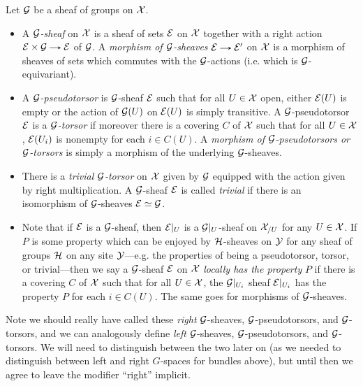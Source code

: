 \begin{definitions}
  Let $\mathcal{G}$ be a sheaf of groups on $\mathcal{X}$.
  \begin{itemize}
  \item A \emph{$\mathcal{G}$-sheaf} on $\mathcal{X}$ is a sheaf of sets $\mathcal{E}$ on $\mathcal{X}$
    together with a right action $\E \times \G \to \E$ of $\mathcal{G}$. A
    \emph{morphism of $\mathcal{G}$-sheaves} $\E \to \E'$ on $\mathcal{X}$ is a morphism
    of sheaves of sets which commutes with the $\mathcal{G}$-actions
    (i.e. which is $\mathcal{G}$-equivariant).
  \item A \emph{$\mathcal{G}$-pseudotorsor} is $\mathcal{G}$-sheaf $\mathcal{E}$ such that for
    all $U \in \mathcal{X}$ open, either $\mathcal{E}(U)$ is empty or the action of
    $\mathcal{G}(U)$ on $\mathcal{E}(U)$ is simply transitive. A $\mathcal{G}$-pseudotorsor $\mathcal{E}$
    is a \emph{$\mathcal{G}$-torsor} if moreover there is a covering $C$ of
    $\mathcal{X}$ such that for all $U \in \mathcal{X}$, $\mathcal{E}(U_i)$ is nonempty for each
    $i \in C(U)$. A \emph{morphism of $\mathcal{G}$-pseudotorsors or
      $\mathcal{G}$-torsors} is simply a morphism of the underlying
    $\mathcal{G}$-sheaves.
  \item There is a \emph{trivial $\mathcal{G}$-torsor} on $\mathcal{X}$ given by $\mathcal{G}$
    equipped with the action given by right multiplication. A
    $\mathcal{G}$-sheaf $\mathcal{E}$ is called \emph{trivial} if there is an
    isomorphism of $\mathcal{G}$-sheaves $\mathcal{E} \simeq \mathcal{G}$.
  \item Note that if $\mathcal{E}$ is a $\mathcal{G}$-sheaf, then $\mathcal{E}|_U$ is a
    $\mathcal{G}|_U$-sheaf on $\mathcal{X}_{/U}$ for any $U \in \mathcal{X}$. If $P$ is some
    property which can be enjoyed by $\mathcal{H}$-sheaves on $\mathcal{Y}$ for any
    sheaf of groups $\mathcal{H}$ on any site $\mathcal{Y}$---e.g. the properties of
    being a pseudotorsor, torsor, or trivial---then we say a
    $\mathcal{G}$-sheaf $\mathcal{E}$ on $\mathcal{X}$ \emph{locally has the property} $P$ if
    there is a covering $C$ of $\mathcal{X}$ such that for all $U \in \mathcal{X}$, the
    $\mathcal{G}|_{U_i}$ sheaf $\mathcal{E}|_{U_i}$ has the property $P$ for each $i \in
    C(U)$. The same goes for morphisms of $\mathcal{G}$-sheaves.
  \end{itemize}
\end{definitions}

\begin{remark}
  Note we should really have called these \emph{right} $\mathcal{G}$-sheaves,
  $\mathcal{G}$-pseudotorsors, and $\mathcal{G}$-torsors, and we can analogously define
  \emph{left} $\mathcal{G}$-sheaves, $\mathcal{G}$-pseudotorsors, and $\mathcal{G}$-torsors. We
  will need to distinguish between the two later on (as we needed to
  distinguish between left and right $G$-spaces for bundles above),
  but until then we agree to leave the modifier ``right'' implicit.
\end{remark}

